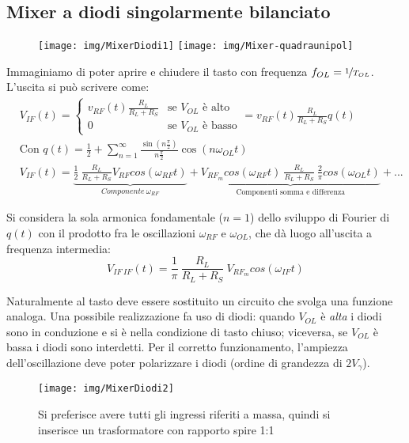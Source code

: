 \subsection{Mixer a diodi singolarmente bilanciato}
\begin{figure}[h]
	\texttt{[image: img/MixerDiodi1]}
	\hfill
	\texttt{[image: img/Mixer-quadraunipol]}
	\caption{}
	\label{fig:mixer-005}
\end{figure}

Immaginiamo di poter aprire e chiudere il tasto con frequenza $f_{OL} = \nicefrac{1}{T_{OL}}$. L'uscita si può scrivere come:
\begin{align*}
&V_{IF}(t) =
\begin{cases}
v_{RF}(t) \frac{R_L}{R_L+R_S} & \mbox{se $V_{OL}$ è alto}\\
0 & \mbox{se $V_{OL}$ è basso}
\end{cases} = v_{RF}(t) \frac{R_L}{R_L+R_S} q(t)
\\
&\mbox{Con } q(t) = \frac{1}{2} + \sum_{n=1}^{\infty} \frac{\sin(n\frac{\pi}{2})}{n\frac{\pi}{2}} \cos(n\omega_{OL} t)
\\
& V_{IF}(t) = \underbrace{\frac{1}{2}~\frac{R_L}{R_L + R_S} V_{RF}cos(\omega_{RF}t)}_{Componente~\omega_{RF}}
+ \underbrace{V_{RF_m} cos(\omega_{RF} t) ~ \frac{R_L}{R_L + R_S} ~ \frac{2}{\pi} cos(\omega_{OL} t)}_\text{Componenti somma e differenza} + ...
\end{align*}

Si considera la sola armonica fondamentale ($n=1$) dello sviluppo di Fourier di $q(t)$ con il prodotto fra le oscillazioni $\omega_{RF}$ e $\omega_{OL}$, che dà luogo all'uscita a frequenza intermedia:
\[
V_{IF~IF}(t) = \frac{1}{\pi}~ \frac{R_L}{R_L + R_S} ~ V_{RF_m} cos(\omega_{IF} t)
\]

Naturalmente al tasto deve essere sostituito un circuito che svolga una funzione analoga. Una possibile realizzazione fa uso di diodi: 
quando $V_{OL}$ è \textit{alta} i diodi sono in conduzione e si è nella condizione di tasto chiuso; viceversa, se $V_{OL}$ è bassa i diodi sono interdetti.
Per il corretto funzionamento, l'ampiezza dell'oscillazione deve poter polarizzare i diodi (ordine di grandezza di $2 V_\gamma$).


\begin{figure}[hbt]
	\centering
	\texttt{[image: img/MixerDiodi2]}
	\caption{Si preferisce avere tutti gli ingressi riferiti a massa, quindi si inserisce un trasformatore con rapporto spire 1:1}
	\label{fig:mixer-007}
\end{figure}

